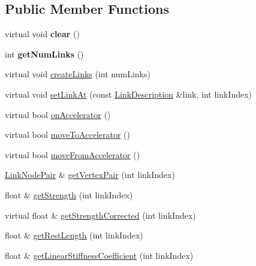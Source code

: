 \subsection*{Public Member Functions}
\begin{DoxyCompactItemize}
\item 
\hypertarget{classbt_soft_body_link_data_a9a664715147e0f7858236fd2251fc298}{virtual void {\bfseries clear} ()}\label{classbt_soft_body_link_data_a9a664715147e0f7858236fd2251fc298}

\item 
\hypertarget{classbt_soft_body_link_data_a5699392f6a67800771651d3ac5a26350}{int {\bfseries get\+Num\+Links} ()}\label{classbt_soft_body_link_data_a5699392f6a67800771651d3ac5a26350}

\item 
virtual void \hyperlink{classbt_soft_body_link_data_a1713d14604037ca88d7915d627a32a13}{create\+Links} (int num\+Links)
\item 
virtual void \hyperlink{classbt_soft_body_link_data_a44f200dcb878405cebf3704dc7a8b8cd}{set\+Link\+At} (const \hyperlink{classbt_soft_body_link_data_1_1_link_description}{Link\+Description} \&link, int link\+Index)
\item 
virtual bool \hyperlink{classbt_soft_body_link_data_ae284c2a182ddf82dde057a8c2eb17ac3}{on\+Accelerator} ()
\item 
virtual bool \hyperlink{classbt_soft_body_link_data_a6cce268f804d465f3bc998771d3a7433}{move\+To\+Accelerator} ()
\item 
virtual bool \hyperlink{classbt_soft_body_link_data_a5018ad236aae590df94bca63c1ad7ee1}{move\+From\+Accelerator} ()
\item 
\hyperlink{classbt_soft_body_link_data_1_1_link_node_pair}{Link\+Node\+Pair} \& \hyperlink{classbt_soft_body_link_data_ab0e3a69e9aec84ed318b3a3d17f57051}{get\+Vertex\+Pair} (int link\+Index)
\item 
float \& \hyperlink{classbt_soft_body_link_data_aedff3a1100ab4177e7035a6400f91b87}{get\+Strength} (int link\+Index)
\item 
virtual float \& \hyperlink{classbt_soft_body_link_data_a3b6e8d1a150ec23efd999760ea7a17b3}{get\+Strength\+Corrected} (int link\+Index)
\item 
float \& \hyperlink{classbt_soft_body_link_data_a2552fa98541e800fc6de8ef7ec2a6a8e}{get\+Rest\+Length} (int link\+Index)
\item 
float \& \hyperlink{classbt_soft_body_link_data_a971e0e406838f2c2d3b88db80747d09d}{get\+Linear\+Stiffness\+Coefficient} (int link\+Index)

\end{DoxyCompactItemize}
